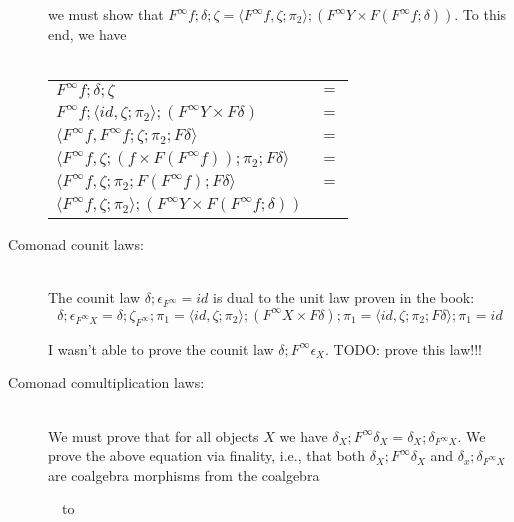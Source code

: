 \documentclass{article}
\begin{document}
\begin{description}
we must show that $F^{\infty}f;\delta;\zeta = \langle F^{\infty}f, \zeta;\pi_2 \rangle;(F^{\infty}Y \times F(F^{\infty}f;\delta))$.
To this end, we have\\~\\
\begin{tabular}{ll}
$F^{\infty}f;\delta;\zeta$ & $=$ \\
$F^{\infty}f;\langle \mathit{id}, \zeta;\pi_2 \rangle;(F^{\infty}Y \times F\delta)$ & $=$ \\
$\langle F^{\infty}f, F^{\infty}f;\zeta;\pi_2;F\delta \rangle$ & $=$ \\
$\langle F^{\infty}f, \zeta;(f \times F(F^{\infty}f));\pi_2;F\delta \rangle$ & $=$ \\
$\langle F^{\infty}f, \zeta;\pi_2;F(F^{\infty}f);F\delta \rangle$ & $=$ \\
$\langle F^{\infty}f, \zeta;\pi_2 \rangle;(F^{\infty}Y \times F(F^{\infty}f;\delta))$ &
\end{tabular}

\item[Comonad counit laws:]~\\

The counit law $\delta;\epsilon_{F^{\infty}} = id$ is dual to the unit law proven in the book:
$$\delta;\epsilon_{F^\infty X} = \delta;\zeta_{F^\infty};\pi_1 
  = \langle id, \zeta;\pi_2 \rangle;(F^\infty X \times F\delta);\pi_1 = \langle id, \zeta;\pi_2;F\delta \rangle;\pi_1
= id$$

I wasn't able to prove the counit law $\delta;F^{\infty}\epsilon_X$. TODO: prove this law!!!

\item[Comonad comultiplication laws:]~\\

We must prove that for all objects $X$ we have $\delta_X;F^\infty\delta_X = \delta_X;\delta_{F^\infty X}$.
We prove the above equation via finality, i.e., that both $\delta_X;F^\infty\delta_X$ and $\delta_x;\delta_{F^\infty X}$ 
are coalgebra morphisms from the coalgebra
\begin{center}
~~to~~
\end{center} 


\end{description}
\end{document}
